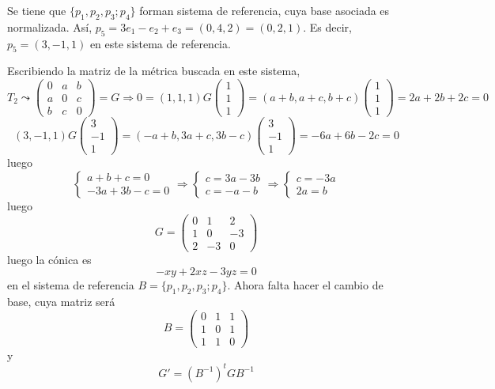 \begin{sol}
    Se tiene que $\{p_1,p_2,p_3;p_4\}$ forman sistema de referencia, cuya base asociada es normalizada. As\'i, $p_5=3e_1-e_2+e_3=(0,4,2)=(0,2,1)$. Es decir, $p_5=(3,-1,1)$ en este sistema de referencia. 

    Escribiendo la matriz de la m\'etrica buscada en este sistema,
    $$T_2 \leadsto \begin{pmatrix}
        0 & a & b \\ a & 0 & c \\ b & c & 0
    \end{pmatrix}=G \Rightarrow 0 = (1,1,1)G \begin{pmatrix}
        1\\1\\1
    \end{pmatrix}=(a+b,a+c,b+c)\begin{pmatrix}
        1\\1\\1
    \end{pmatrix}=2a+2b+2c=0$$
    $$(3,-1,1) G \begin{pmatrix}
        3 \\ -1 \\ 1
    \end{pmatrix} = (-a+b, 3a+c,3b-c)\begin{pmatrix}
        3 \\ -1 \\ 1
    \end{pmatrix}=-6a+6b-2c=0$$
    luego 
    $$\begin{cases}
        a+b+c=0 \\ -3a+3b-c=0
    \end{cases}\Rightarrow \begin{cases}
        c=3a-3b \\ c=-a-b
    \end{cases} \Rightarrow \begin{cases}
        c=-3a \\ 2a=b
    \end{cases}$$
    luego 
    $$G=\begin{pmatrix}
        0 & 1 & 2\\ 1 & 0 & -3 \\ 2 & -3 & 0
    \end{pmatrix}$$
    luego la c\'onica es 
    $$-xy+2xz-3yz=0$$
    en el sistema de referencia $B=\{p_1,p_2, p_3;p_4\}$. Ahora falta hacer el cambio de base, cuya matriz ser\'a 
    $$B=\begin{pmatrix}
         0 & 1 & 1 \\ 1 & 0 & 1 \\ 1 & 1 & 0
    \end{pmatrix}$$
    y 
    $$G'=(B^{-1})^t G B^{-1}$$
\end{sol}
